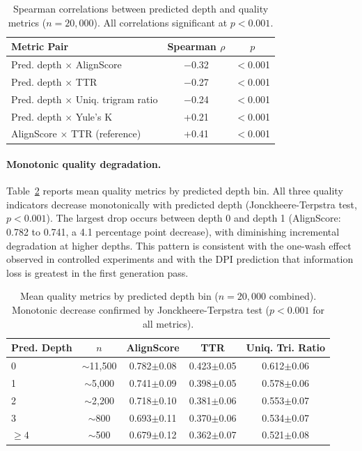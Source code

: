 \documentclass[11pt,a4paper]{article}
\begin{document}
\begin{table}[t]
\centering
\small
\begin{tabular}{lcc}
\toprule
\textbf{Metric Pair} & \textbf{Spearman $\rho$} & $p$ \\
\midrule
Pred. depth $\times$ AlignScore & $-$0.32 & $<$0.001 \\
Pred. depth $\times$ TTR & $-$0.27 & $<$0.001 \\
Pred. depth $\times$ Uniq. trigram ratio & $-$0.24 & $<$0.001 \\
Pred. depth $\times$ Yule's K & +0.21 & $<$0.001 \\
AlignScore $\times$ TTR (reference) & +0.41 & $<$0.001 \\
\bottomrule
\end{tabular}
\caption{Spearman correlations between predicted depth and quality metrics ($n = 20{,}000$). All correlations significant at $p < 0.001$.}
\label{tab:cc-corr}
\end{table}

\paragraph{Monotonic quality degradation.} Table~\ref{tab:cc-quality} reports mean quality metrics by predicted depth bin. All three quality indicators decrease monotonically with predicted depth (Jonckheere-Terpstra test, $p < 0.001$). The largest drop occurs between depth 0 and depth 1 (AlignScore: 0.782 to 0.741, a 4.1 percentage point decrease), with diminishing incremental degradation at higher depths. This pattern is consistent with the one-wash effect observed in controlled experiments and with the DPI prediction that information loss is greatest in the first generation pass.

\begin{table}[t]
\centering
\small
\begin{tabular}{lcccc}
\toprule
\textbf{Pred. Depth} & $n$ & \textbf{AlignScore} & \textbf{TTR} & \textbf{Uniq. Tri. Ratio} \\
\midrule
0 & $\sim$11,500 & 0.782$\pm$0.08 & 0.423$\pm$0.05 & 0.612$\pm$0.06 \\
1 & $\sim$5,000 & 0.741$\pm$0.09 & 0.398$\pm$0.05 & 0.578$\pm$0.06 \\
2 & $\sim$2,200 & 0.718$\pm$0.10 & 0.381$\pm$0.06 & 0.553$\pm$0.07 \\
3 & $\sim$800 & 0.693$\pm$0.11 & 0.370$\pm$0.06 & 0.534$\pm$0.07 \\
$\geq 4$ & $\sim$500 & 0.679$\pm$0.12 & 0.362$\pm$0.07 & 0.521$\pm$0.08 \\
\bottomrule
\end{tabular}
\caption{Mean quality metrics by predicted depth bin ($n = 20{,}000$ combined). Monotonic decrease confirmed by Jonckheere-Terpstra test ($p < 0.001$ for all metrics).}
\label{tab:cc-quality}
\end{table}
\end{document}
